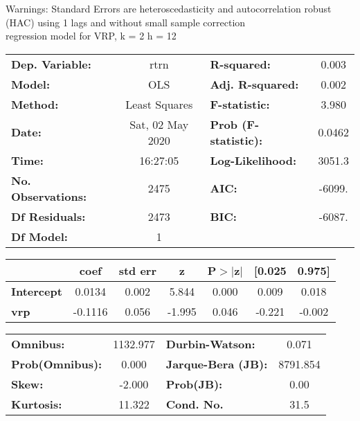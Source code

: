 Warnings: \newline
 [1] Standard Errors are heteroscedasticity and autocorrelation robust (HAC) using 1 lags and without small sample correction\\ 

regression model for VRP, k = 2 h = 12\begin{center}
\begin{tabular}{lclc}
\toprule
\textbf{Dep. Variable:}    &       rtrn       & \textbf{  R-squared:         } &     0.003   \\
\textbf{Model:}            &       OLS        & \textbf{  Adj. R-squared:    } &     0.002   \\
\textbf{Method:}           &  Least Squares   & \textbf{  F-statistic:       } &     3.980   \\
\textbf{Date:}             & Sat, 02 May 2020 & \textbf{  Prob (F-statistic):} &   0.0462    \\
\textbf{Time:}             &     16:27:05     & \textbf{  Log-Likelihood:    } &    3051.3   \\
\textbf{No. Observations:} &        2475      & \textbf{  AIC:               } &    -6099.   \\
\textbf{Df Residuals:}     &        2473      & \textbf{  BIC:               } &    -6087.   \\
\textbf{Df Model:}         &           1      & \textbf{                     } &             \\
\bottomrule
\end{tabular}
\begin{tabular}{lcccccc}
                   & \textbf{coef} & \textbf{std err} & \textbf{z} & \textbf{P$> |$z$|$} & \textbf{[0.025} & \textbf{0.975]}  \\
\midrule
\textbf{Intercept} &       0.0134  &        0.002     &     5.844  &         0.000        &        0.009    &        0.018     \\
\textbf{vrp}       &      -0.1116  &        0.056     &    -1.995  &         0.046        &       -0.221    &       -0.002     \\
\bottomrule
\end{tabular}
\begin{tabular}{lclc}
\textbf{Omnibus:}       & 1132.977 & \textbf{  Durbin-Watson:     } &    0.071  \\
\textbf{Prob(Omnibus):} &   0.000  & \textbf{  Jarque-Bera (JB):  } & 8791.854  \\
\textbf{Skew:}          &  -2.000  & \textbf{  Prob(JB):          } &     0.00  \\
\textbf{Kurtosis:}      &  11.322  & \textbf{  Cond. No.          } &     31.5  \\
\bottomrule
\end{tabular}
\end{center}


